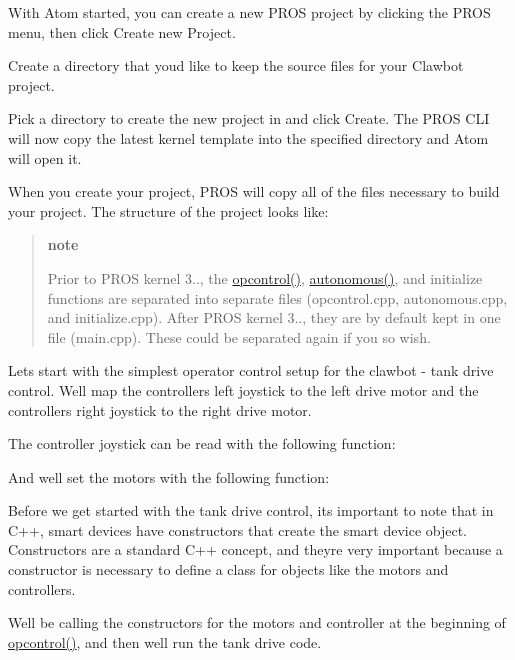 With Atom started, you can create a new P\+R\+OS project by clicking the {\ttfamily P\+R\+OS} menu, then click {\ttfamily Create new Project}.

Create a directory that you\textquotesingle{}d like to keep the source files for your Clawbot project.

Pick a directory to create the new project in and click Create. The P\+R\+OS C\+LI will now copy the latest kernel template into the specified directory and Atom will open it.

When you create your project, P\+R\+OS will copy all of the files necessary to build your project. The structure of the project looks like\+:

\begin{quote}
{\bfseries note}

Prior to P\+R\+OS kernel 3.., the {\ttfamily \hyperlink{main_8h_a1903abdb5ef0f301d660754c8315fc17}{opcontrol()}}, {\ttfamily \hyperlink{main_8h_a2df3d06bc5bced154da27fce393f991f}{autonomous()}}, and initialize functions are separated into separate files (opcontrol.\+cpp, autonomous.\+cpp, and initialize.\+cpp). After P\+R\+OS kernel 3.., they are by default kept in one file (main.\+cpp). These could be separated again if you so wish. \end{quote}


Let\textquotesingle{}s start with the simplest operator control setup for the clawbot -\/ tank drive control. We\textquotesingle{}ll map the controller\textquotesingle{}s left joystick to the left drive motor and the controller\textquotesingle{}s right joystick to the right drive motor.

The controller joystick can be read with the following function\+:

And we\textquotesingle{}ll set the motors with the following function\+:

Before we get started with the tank drive control, it\textquotesingle{}s important to note that in C++, smart devices have constructors that create the smart device object. Constructors are a standard C++ concept, and they\textquotesingle{}re very important because a constructor is necessary to define a class for objects like the motors and controllers.

We\textquotesingle{}ll be calling the constructors for the motors and controller at the beginning of {\ttfamily \hyperlink{main_8h_a1903abdb5ef0f301d660754c8315fc17}{opcontrol()}}, and then we\textquotesingle{}ll run the tank drive code.

